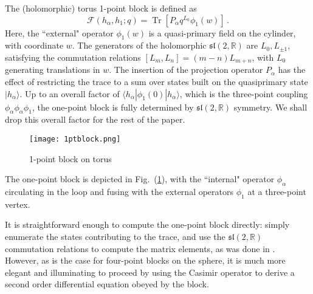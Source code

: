 \documentclass[12pt]{article}
\newcommand{\sltwo}{$\lie{sl}(2,\RR)$ }
\newcommand{\RR}{\mathbb{R}}
\newcommand\rref[1]{(\ref{#1})}
\newcommand{\lie}[1]{\mathfrak{#1}}
\DeclareMathOperator{\Tr}{Tr}
\begin{document}
The (holomorphic) torus 1-point block is defined as
\begin{equation}\label{blockdef}
\mathcal{F}(h_{\alpha},h_1;q)=\Tr \left[ P_{\alpha}q^{L_0}\phi_1(w)\right] \,.
\end{equation}
Here, the ``external" operator $\phi_1(w)$ is a quasi-primary field on the cylinder, with coordinate $w$. The generators of the holomorphic \sltwo are $L_0,L_{\pm 1}$, satisfying the commutation relations $[L_m,L_n] = (m-n)L_{m+n}$, with $L_0$ generating translations in $w$. The insertion of the projection operator $P_\alpha$ has the effect of restricting the trace to a sum over states built on the quasiprimary state $|h_\alpha\rangle$. Up to an overall factor of  $\langle h_\alpha|\phi_1(0)|h_\alpha\rangle$, which is the three-point coupling $\phi_\alpha \phi_\alpha \phi_1$, the one-point block is fully determined by \sltwo symmetry. We shall drop this overall factor for the rest of the paper.
\begin{figure}
\centering
  \texttt{[image: 1ptblock.png]}\\
  \caption{1-point block on torus}\label{1pttorus}
\end{figure}
 The one-point block is depicted in Fig.~\rref{1pttorus}, with the ``internal" operator $\phi_\alpha$ circulating in the loop and fusing with the external operators $\phi_1$ at a three-point vertex.

It is straightforward enough to compute the one-point block directly: simply enumerate the states contributing to the trace, and use the  \sltwo  commutation relations to compute the matrix elements, as was done in \cite{Hadasz:2009db}. However, as is the case for four-point blocks on the sphere, it is much more elegant and illuminating to proceed by using the Casimir operator to derive a second order differential equation obeyed by the block.
\end{document}
